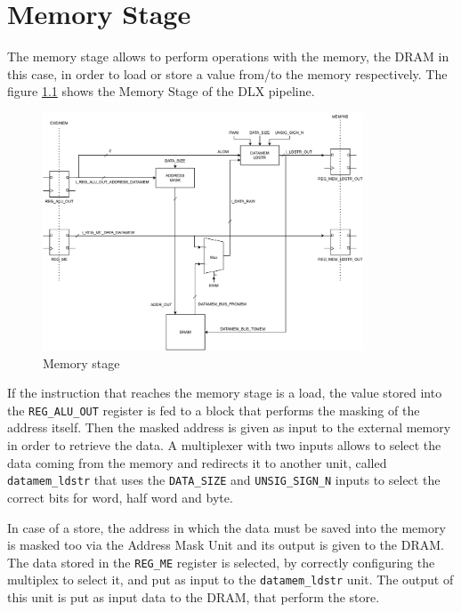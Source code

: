 \chapter{Memory Stage}
\label{chp:memory_stage}
The memory stage allows to perform operations with the memory, the DRAM in this case, in order to load or store a value from/to the memory respectively. The figure \ref{fig:mem_stage} shows the Memory Stage of the DLX pipeline.

\begin{figure}[H]   
	\centering
	\includegraphics[width=0.85\textwidth]{chapters/6_MemoryStage/images/mem_stage.pdf}
	\caption{Memory stage}
	\label{fig:mem_stage}
\end{figure}

If the instruction that reaches the memory stage is a load, the value stored into the \texttt{REG\_ALU\_OUT} register is fed to a block that performs the masking of the address itself. Then the masked address is given as input to the external memory in order to retrieve the data. A multiplexer with two inputs allows to select the data coming from the memory and redirects it to another unit, called \texttt{datamem\_ldstr} that uses the \texttt{DATA\_SIZE} and \texttt{UNSIG\_SIGN\_N} inputs to select the correct bits for word, half word and byte.

In case of a store, the address in which the data must be saved into the memory is masked too via the Address Mask Unit and its output is given to the DRAM. The data stored in the \texttt{REG\_ME} register is selected, by correctly configuring the multiplex to select it, and put as input to the \texttt{datamem\_ldstr} unit. The output of this unit is put as input data to the DRAM, that perform the store.

